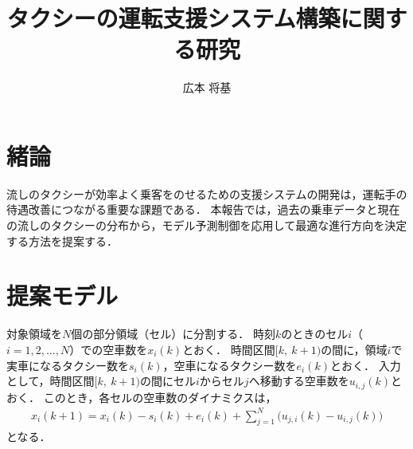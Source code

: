 \documentclass[a4j,9pt,twocolumn]{paper}
\title{タクシーの運転支援システム構築に関する研究}	%
\author{広本 将基}		%
\begin{document}
\absttitle		%

\section{緒論}
流しのタクシーが効率よく乗客をのせるための支援システムの開発は，運転手の待遇改善につながる重要な課題である．
本報告では，過去の乗車データと現在の流しのタクシーの分布から，モデル予測制御を応用して最適な進行方向を決定する方法を提案する．

\section{提案モデル}
対象領域を$N$個の部分領域（セル）に分割する．
時刻$k$のときのセル$i$（$i = 1, 2, \ldots, N$）での空車数を$x_i(k)$とおく．
時間区間$[k,\ k+1)$の間に，領域$i$で実車になるタクシー数を$s_i(k)$，空車になるタクシー数を$e_i(k)$とおく．
入力として，時間区間$[k,\ k+1)$の間にセル$i$からセル$j$へ移動する空車数を$u_{i, j}(k)$とおく．
このとき，各セルの空車数のダイナミクスは，
\begin{align}
 x_i(k+1) = x_i(k)-s_i(k)+e_i(k)+\sum_{j=1}^{N}\bigg(u_{j,i}(k)-u_{i,j}(k) \bigg) \label{eq:x}
\end{align}
となる．
\end{document}
